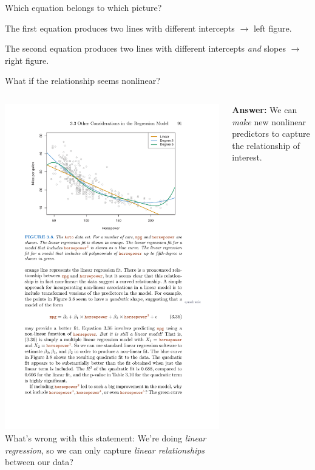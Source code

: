 \documentclass[aspectratio=169]{beamer}
\begin{document}
\begin{frame}{Which equation belongs to which picture?}
\vspace{3mm}

The first equation produces two lines with different intercepts $\rightarrow$ left figure.  

\vspace{3mm}

The second equation produces two lines with different intercepts \textit{and} slopes $\rightarrow$ right figure.  
\end{frame}

\begin{frame}{What if the relationship seems nonlinear?}

\begin{columns}
\includegraphics[width=\textwidth]{MPGvHorsepower}
What's wrong with this statement:  We're doing \textit{linear regression}, so we can only capture \textit{linear relationships} between our data?

\vspace{5mm} \pause

\textbf{Answer:}  We can \textit{make} new nonlinear predictors to capture the relationship of interest.

\end{columns}
\end{frame}
\end{document}
